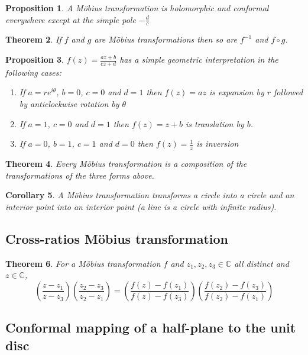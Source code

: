 \documentclass[12pt]{article}
\newtheorem{thm}{Theorem}[section]
\newtheorem{cor}[thm]{Corollary}
\newtheorem{prop}[thm]{Proposition}
\theoremstyle{definition}
\newcommand{\C}{\mathbb{C}}
\begin{document}
\begin{prop}
  A M\"obius transformation is holomorphic and conformal everywhere except at the simple pole $-\frac{d}{c}$
\end{prop}

\begin{thm}
  If $f$ and $g$ are M\"obius transformations then so are $f^{-1}$ and $f \circ g$.
\end{thm}

\begin{prop}
  $f(z) = \frac{az + b}{cz + d}$ has a simple geometric interpretation in the following cases:
  \begin{enumerate}
    \item If $a = re^{i\theta}$, $b = 0$, $c = 0$ and $d = 1$ then $f(z) = az$ is expansion by $r$ followed by anticlockwise rotation by $\theta$
    \item If $a = 1$, $c = 0$ and $d = 1$ then $f(z) = z + b$ is translation by $b$.
    \item If $a = 0$, $b = 1$, $c = 1$ and $d = 0$ then $f(z) = \frac{1}{z}$ is inversion
  \end{enumerate}
\end{prop}

\begin{thm}
  Every M\"obius transformation is a composition of the transformations of the three forms above.
\end{thm}

\begin{cor}
  A M\"obius transformation transforms a circle into a circle and an interior point into an interior point (a line is a circle with infinite radius).
\end{cor}

\subsection{Cross-ratios M\"obius transformation}

\begin{thm}
  For a M\"obius transformation $f$ and $z_1, z_2, z_3 \in \C$ all distinct and $z \in \C$,
  $$\left(\frac{z - z_1}{z - z_3}\right)\left(\frac{z_2 - z_3}{z_2 - z_1}\right) = \left(\frac{f(z) - f(z_1)}{f(z) - f(z_3)}\right)\left(\frac{f(z_2) - f(z_3)}{f(z_2) - f(z_1)}\right)$$
\end{thm}

\subsection{Conformal mapping of a half-plane to the unit disc}
\end{document}
